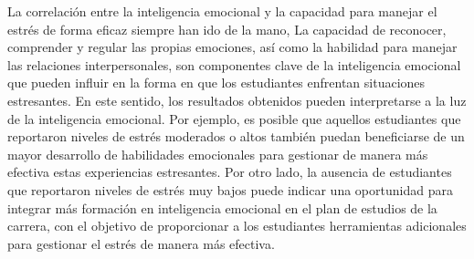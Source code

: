 \documentclass[journal]{IEEEtran}
\begin{document}
\begin{enumerate}
{La correlación entre la inteligencia emocional y la capacidad para manejar el estrés de forma eficaz siempre han ido de la mano, La capacidad de reconocer, comprender y regular las propias emociones, así como la habilidad para manejar las relaciones interpersonales, son componentes clave de la inteligencia emocional que pueden influir en la forma en que los estudiantes enfrentan situaciones estresantes.
En este sentido, los resultados obtenidos pueden interpretarse a la luz de la inteligencia emocional. Por ejemplo, es posible que aquellos estudiantes que reportaron niveles de estrés moderados o altos también puedan beneficiarse de un mayor desarrollo de habilidades emocionales para gestionar de manera más efectiva estas experiencias estresantes. Por otro lado, la ausencia de estudiantes que reportaron niveles de estrés muy bajos puede indicar una oportunidad para integrar más formación en inteligencia emocional en el plan de estudios de la carrera, con el objetivo de proporcionar a los estudiantes herramientas adicionales para gestionar el estrés de manera más efectiva.
}\\


\end{enumerate}
\end{document}

